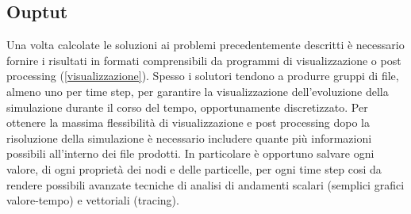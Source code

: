     \subsection{Ouptut}
    Una volta calcolate le soluzioni ai problemi precedentemente descritti è necessario fornire i risultati in formati comprensibili da programmi di visualizzazione o post processing (\ref*{visualizzazione}).
    Spesso i solutori tendono a produrre gruppi di file, almeno uno per time step, per garantire la visualizzazione dell'evoluzione della simulazione durante il corso del tempo, opportunamente discretizzato.
    Per ottenere la massima flessibilità di visualizzazione e post processing dopo la risoluzione della simulazione è necessario includere quante più informazioni possibili all'interno dei file prodotti.
    In particolare è opportuno salvare ogni valore, di ogni proprietà dei nodi e delle particelle, per ogni time step cosi da rendere possibili avanzate tecniche di analisi di andamenti scalari 
    (semplici grafici valore-tempo) e vettoriali (tracing).

